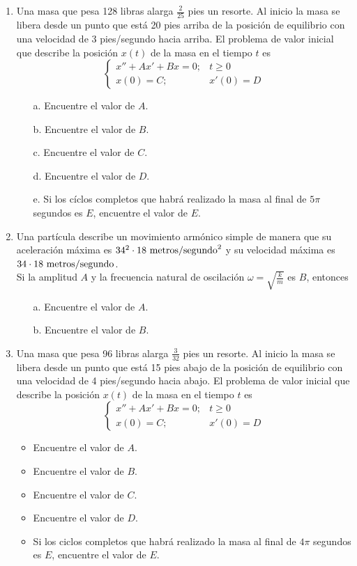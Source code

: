\begin{enumerate}
\item Una masa que pesa 128 libras alarga $\frac{2}{25}$ pies un resorte. Al inicio la masa se libera desde un punto que está 20 pies arriba de la posición de equilibrio con una velocidad de 3 pies/segundo hacia arriba. El problema de valor inicial que describe la posición $x(t)$ de la masa en el tiempo $t$ es 
$$\begin{cases}
    x'' + Ax' + Bx = 0; & t \geq 0 \\
    x(0) = C; & x'(0) = D
\end{cases}$$
\begin{itemize}
    \item[a.] Encuentre el valor de $A$.
    \item[b.] Encuentre el valor de $B$.
    \item[c.] Encuentre el valor de $C$.
    \item[d.] Encuentre el valor de $D$.
    \item[e.] Si los cíclos completos que habrá realizado la masa al final de $5 \pi$ segundos es $E$, encuentre el valor de $E$. 
\end{itemize}
\item Una partícula describe un movimiento armónico simple de manera que su aceleración máxima es $34^2 \cdot 18\ {\rm metros}/{\rm segundo}^2$ y su velocidad máxima es $34 \cdot 18\ {\rm metros}/{\rm segundo}$. \\
Si la amplitud $A$ y la frecuencia natural de oscilación $\omega = \sqrt{\frac{k}{m}}$ es $B$, entonces
\begin{itemize}
    \item[a.] Encuentre el valor de $A$.
    \item[b.] Encuentre el valor de $B$. 
\end{itemize}

\item Una masa que pesa 96 libras alarga $\frac{3}{32}$ pies un resorte. Al inicio la masa se libera desde un punto que está 15 pies abajo de la posición de equilibrio con una velocidad de 4 pies/segundo hacia abajo. El problema de valor inicial que describe la posición $x(t)$ de la masa en el tiempo $t$ es 
$$\begin{cases}     
x'' + Ax' + Bx = 0; & t \geq 0 \\     
x(0) = C; & x'(0) = D 
\end{cases}$$

\begin{itemize}
    \item Encuentre el valor de $A$.
    \item Encuentre el valor de $B$.
    \item Encuentre el valor de $C$.
    \item Encuentre el valor de $D$.
    \item Si los ciclos completos que habrá realizado la masa al final de $4\pi$ segundos es $E$, encuentre el valor de $E$.
\end{itemize}


\end{enumerate}
